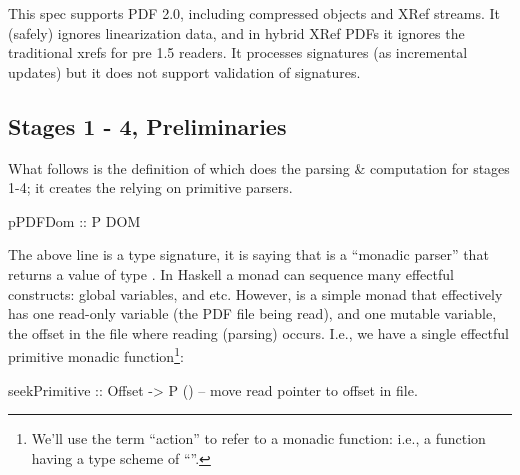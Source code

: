 
This spec supports PDF 2.0, including compressed objects and XRef streams.
%
It (safely) ignores linearization data, and in hybrid XRef PDFs
it ignores the traditional xrefs for pre 1.5 readers.
It processes signatures (as incremental updates) but it does not support
validation of signatures.


\subsection{Stages 1 - 4, Preliminaries}

\iffalse
\begin{code}
{-# LANGUAGE EmptyDataDecls, TypeOperators, LambdaCase #-}
module Spec where
import           Control.Monad
import           Data.Char
import           Data.Foldable(foldlM)
import qualified Data.Map as M
import           Data.Map(Map)
import           Types
import           Utils
import           Primitives
import           Streams
\end{code}
\fi

What follows is the definition of  which does the
parsing \& computation for stages 1-4;
it creates the  relying on primitive parsers.
\begin{code}
pPDFDom :: P DOM
\end{code}
The above line is a type signature, it is saying that
 is a ``monadic parser''  that returns a
value of type .
In Haskell a monad can sequence many effectful constructs: global variables,
and etc. However,  is a simple monad that effectively has one
read-only variable (the PDF file being read), and one mutable variable,
the offset in the file where reading (parsing) occurs.  I.e., we have
a single effectful primitive monadic function\footnote{
  We'll use the term ``action'' to refer to a monadic function:
  i.e., a function having a type scheme of ``''.
}:
\begin{codeNoExecute}
seekPrimitive :: Offset -> P () -- move read pointer to offset in file.
\end{codeNoExecute}

